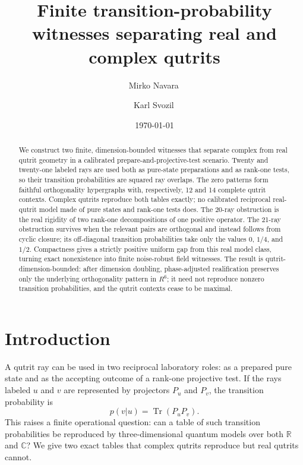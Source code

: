 \documentclass[twocolumn,aps,pra,floatfix,amsmath,amssymb,longbibliography]{revtex4-2}
\theoremstyle{definition}
\theoremstyle{remark}
\newcommand{\C}{\mathbb C}
\newcommand{\R}{\mathbb R}
\begin{document}
\title{Finite transition-probability witnesses separating real and complex qutrits}

\author{Mirko Navara\,}

\author{Karl Svozil\,}

\date{\today}

\begin{abstract}
We construct two finite, dimension-bounded witnesses that separate complex
from real qutrit geometry in a calibrated prepare-and-projective-test
scenario.  Twenty and twenty-one labeled rays are used both as pure-state
preparations and as rank-one tests, so their transition probabilities are
squared ray overlaps.  The zero patterns form faithful orthogonality
hypergraphs with, respectively, 12 and 14 complete qutrit contexts.  Complex
qutrits reproduce both tables exactly; no calibrated reciprocal real-qutrit
model made of pure states and rank-one tests does.  The 20-ray obstruction is
the real rigidity of two rank-one decompositions of one positive operator.  The
21-ray obstruction
survives when the relevant pairs are orthogonal and instead follows from
cyclic closure; its off-diagonal transition probabilities take only the
values $0$, $1/4$, and $1/2$.  Compactness gives a strictly positive uniform
gap from this real model class, turning exact nonexistence into finite
noise-robust field witnesses.  The result is qutrit-dimension-bounded: after
dimension doubling, phase-adjusted realification preserves only the underlying
orthogonality pattern in $R^6$; it need not reproduce nonzero transition
probabilities, and the qutrit contexts cease to be maximal.
\end{abstract}

\maketitle

\section{Introduction}

A qutrit ray can be used in two reciprocal laboratory roles: as a prepared
pure state and as the accepting outcome of a rank-one projective test.  If the
rays labeled $u$ and $v$ are represented by projectors $P_u$ and $P_v$, the
transition probability is
\begin{equation}
 p(v|u)=\operatorname{Tr}(P_uP_v).
 \label{eq:intro-transition}
\end{equation}
This raises a finite operational question: can a table of such transition
probabilities be reproduced by three-dimensional quantum models over both
$\R$ and $\C$?  We give two exact tables that complex qutrits reproduce but
real qutrits cannot.
\end{document}
